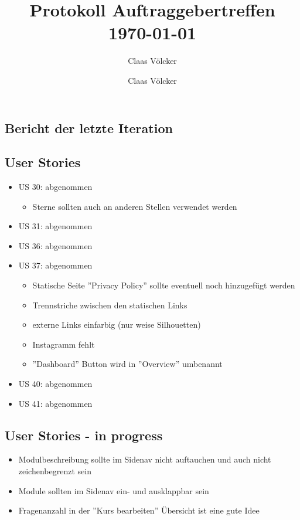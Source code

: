 \documentclass[colorback, accentcolor=tud1c, paper=a4]{tudexercise}
\title{Protokoll Auftraggebertreffen \today}
\subtitle{Claas Völcker}
\author{Claas Völcker}
\begin{document}
\maketitle

\begin{multicols}{2}

\section*{Bericht der letzte Iteration}
\subsection*{User Stories}
\begin{itemize}
	\item US 30: abgenommen
	\begin{itemize}
		\item Sterne sollten auch an anderen Stellen verwendet werden
	\end{itemize}
	\item US 31: abgenommen
	\item US 36: abgenommen
	\item US 37: abgenommen
	\begin{itemize}
		\item Statische Seite ''Privacy Policy'' sollte eventuell noch hinzugefügt werden
		\item Trennstriche zwischen den statischen Links
		\item externe Links einfarbig (nur weise Silhouetten)
		\item Instagramm fehlt
		\item ''Dashboard'' Button wird in ''Overview'' umbenannt
	\end{itemize}
	\item US 40: abgenommen	
	\item US 41: abgenommen
\end{itemize}

\subsection*{User Stories - in progress}
\begin{itemize}
	\item Modulbeschreibung sollte im Sidenav nicht auftauchen und auch nicht zeichenbegrenzt sein
	\item Module sollten im Sidenav ein- und ausklappbar sein
	\item Fragenanzahl in der ''Kurs bearbeiten'' Übersicht ist eine gute Idee
\end{itemize}


\end{multicols}
\end{document}
